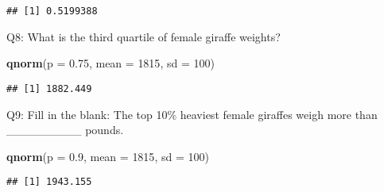 \documentclass[]{article}
\newenvironment{Shaded}{\begin{snugshade}}{\end{snugshade}}
\newcommand{\DataTypeTok}[1]{\textcolor[rgb]{0.13,0.29,0.53}{#1}}
\newcommand{\DecValTok}[1]{\textcolor[rgb]{0.00,0.00,0.81}{#1}}
\newcommand{\FloatTok}[1]{\textcolor[rgb]{0.00,0.00,0.81}{#1}}
\newcommand{\KeywordTok}[1]{\textcolor[rgb]{0.13,0.29,0.53}{\textbf{#1}}}
\newcommand{\NormalTok}[1]{#1}
\begin{document}
\begin{verbatim}
## [1] 0.5199388
\end{verbatim}

Q8: What is the third quartile of female giraffe weights?

\begin{Shaded}
\begin{Highlighting}[]
\KeywordTok{qnorm}\NormalTok{(}\DataTypeTok{p =} \FloatTok{0.75}\NormalTok{, }\DataTypeTok{mean =} \DecValTok{1815}\NormalTok{, }\DataTypeTok{sd =} \DecValTok{100}\NormalTok{)}
\end{Highlighting}
\end{Shaded}

\begin{verbatim}
## [1] 1882.449
\end{verbatim}

Q9: Fill in the blank: The top 10\% heaviest female giraffes weigh more
than \_\_\_\_\_\_\_\_\_ pounds.

\begin{Shaded}
\begin{Highlighting}[]
\KeywordTok{qnorm}\NormalTok{(}\DataTypeTok{p =} \FloatTok{0.9}\NormalTok{, }\DataTypeTok{mean =} \DecValTok{1815}\NormalTok{, }\DataTypeTok{sd =} \DecValTok{100}\NormalTok{)}
\end{Highlighting}
\end{Shaded}

\begin{verbatim}
## [1] 1943.155
\end{verbatim}
\end{document}
